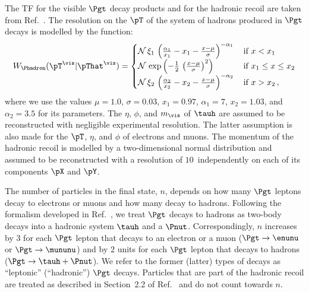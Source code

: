 The TF for the visible $\Pgt$ decay products and for the hadronic recoil are taken from Ref.~\cite{SVfitMEM}.
The resolution on the $\pT$ of the system of hadrons produced in $\Pgt$ decays is modelled by the function:
\begin{equation}
W_{\Phadron}( \pT^{\vis} | \pThat^{\vis} ) = 
 \begin{cases}
   \mathcal{N} \, \xi_{1} \, \left( \frac{\alpha_{1}}{x_{1}} - x_{1} - \frac{x - \mu}{\sigma} \right)^{-\alpha_{1}} \,  
 & \mbox{if } x < x_{1} \\
   \mathcal{N} \, \exp\left( -\frac{1}{2} \, \left( \frac{x - \mu}{\sigma} \right)^{2} \right) \,
 & \mbox{if } x_{1} \leq x \leq x_{2} \\
   \mathcal{N} \, \xi_{2} \, \left( \frac{\alpha_{2}}{x_{2}} - x_{2} - \frac{x - \mu}{\sigma} \right)^{-\alpha_{2}} \, 
 & \mbox{if } x > x_{2} \, ,
 \end{cases}
\label{eq:tf_tauToHadDecays_pT}
\end{equation}
where we use the values $\mu = 1.0$, $\sigma = 0.03$, $x_{1} = 0.97$, $\alpha_{1} = 7$,
$x_{2} = 1.03$, and $\alpha_{2} = 3.5$ for its parameters.
The $\eta$, $\phi$, and $m_{\vis}$ of $\tauh$ are assumed to be reconstructed with negligible experimental resolution.
The latter assumption is also made for the $\pT$, $\eta$, and $\phi$ of electrons and muons.
The momentum of the hadronic recoil is modelled by a two-dimensional normal distribution
and assumed to be reconstructed with a resolution of $10$~\GeV independently on each of its components $\pX$ and $\pY$.

The number of particles in the final state, $n$, depends on how many $\Pgt$ leptons decay to electrons or muons 
and how many decay to hadrons.
Following the formalism developed in Ref.~\cite{SVfitMEM}, 
we treat $\Pgt$ decays to hadrons as two-body decays into a hadronic system $\tauh$ and a $\Pnut$.
Correspondingly, $n$ increases by $3$ for each $\Pgt$ lepton that decays to an electron or a muon ($\Pgt \to \enunu$ or $\Pgt \to \mununu$)
and by $2$ units for each $\Pgt$ lepton that decays to hadrons ($\Pgt \to \tauh + \Pnut$).
We refer to the former (latter) types of decays as ``leptonic'' (``hadronic'') $\Pgt$ decays.
Particles that are part of the hadronic recoil are treated as described in Section~2.2 of Ref.~\cite{SVfitMEM} 
and do not count towards $n$.

